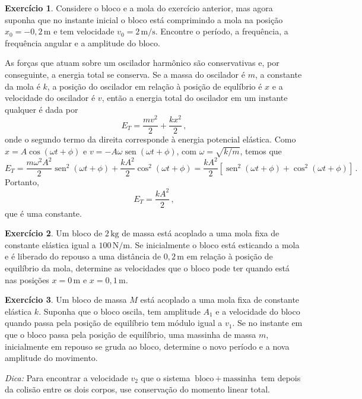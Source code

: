 \documentclass[12pt,a4paper]{article}
\theoremstyle{definition}
\newtheorem{ex}{Exercício}[section]
\DeclareMathOperator{\sen}{sen}
\begin{document}
\begin{ex}
  Considere o bloco e a mola do exercício anterior, mas agora suponha
  que no instante inicial o bloco está comprimindo a mola na posição
  $x_0=-0{,}2\,\mathrm{m}$ e tem velocidade
  $v_0=2\,\mathrm{m/s}$. Encontre o período, a frequência, a
  frequência angular e a amplitude do bloco.
\end{ex}

As forças que atuam sobre um oscilador harmônico são conservativas e,
por conseguinte, a energia total se conserva. Se a massa do oscilador
é $m$, a constante da mola é $k$, a posição do oscilador em relação à
posição de equlíbrio é $x$ e a velocidade do oscilador é $v$, então a
energia total do oscilador em um instante qualquer é dada por
$$E_T=\frac{mv^2}{2}+\frac{kx^2}{2}\,,$$
onde o segundo termo da direita corresponde à energia potencial
elástica. Como $x=A\cos(\omega t+\phi)$ e
$v=-A\omega\sen(\omega t+\phi)$, com $\omega=\sqrt{k/m}$, temos que
$$E_T=\frac{m\omega^2A^2}{2}\sen^2(\omega t+\phi)+\frac{kA^2}{2}\cos^2(\omega t+\phi)=\frac{kA^2}{2}[\sen^2(\omega t+\phi)+\cos^2(\omega t+\phi)]\,.$$
Portanto,
\begin{equation}
  E_T=\frac{kA^2}{2}\,,
\end{equation}
que é uma constante.

\begin{ex}
  Um bloco de $2\,\mathrm{kg}$ de massa está acoplado a uma mola fixa
  de constante elástica igual a $100\,\mathrm{N/m}$. Se inicialmente o
  bloco está esticando a mola e é liberado do repouso a uma distância
  de $0{,}2\,\mathrm{m}$ em relação à posição de equilíbrio da mola,
  determine as velocidades que o bloco pode ter quando está nas
  posições $x=0\,\mathrm{m}$ e $x=0{,}1\,\mathrm{m}$.
\end{ex}

\begin{ex}
  Um bloco de massa $M$ está acoplado a uma mola fixa de constante
  elástica $k$. Suponha que o bloco oscila, tem amplitude $A_1$ e a
  velocidade do bloco quando passa pela posição de equilíbrio tem
  módulo igual a $v_1$. Se no instante em que o bloco passa pela
  posição de equilíbrio, uma massinha de massa $m$, inicialmente em
  repouso se gruda ao bloco, determine o novo período e a nova
  amplitude do movimento.

  \noindent\textit{Dica:} Para encontrar a velocidade $v_2$ que o
  sistema $\text{bloco}\,+\,\text{massinha}$ tem depois da colisão
  entre os dois corpos, use conservação do momento linear total.
\end{ex}
\end{document}
